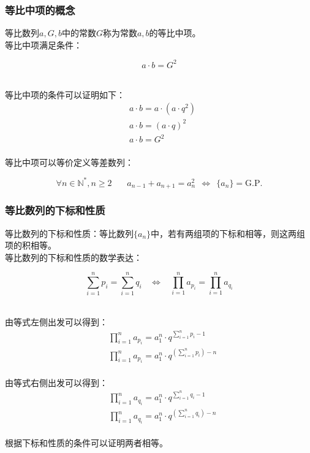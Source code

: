 \documentclass[UTF8]{ctexart}
\begin{document}
\newpage

\subsubsection{等比中项的概念}
    \setcounter{equation}{0}
    等比数列$a,G,b$中的常数$G$称为常数$a,b$的等比中项。\\[3mm]
    等比中项满足条件：
    \begin{large}
        \begin{equation*}
            a\cdot b=G^2
        \end{equation*}
    \end{large}\\
    等比中项的条件可以证明如下：
    \begin{align}
        &a\cdot b=a\cdot (a\cdot q^2)\\[3mm]
        &a\cdot b=(a\cdot q)^2\\[3mm]
        &a\cdot b=G^2
    \end{align}\\
    等比中项可以等价定义等差数列：
    \begin{large}
        \begin{equation*}
            \forall n\in\mathbb{N^*},n\geq 2~~~~~~~~a_{n-1}+a_{n+1}=a_n^2~~\Longleftrightarrow~~\{a_n\}=\text{G.P.}
        \end{equation*}
    \end{large}

\subsubsection{等比数列的下标和性质}
    \setcounter{equation}{0}
    等比数列的下标和性质：等比数列$\{a_n\}$中，若有两组项的下标和相等，则这两组项的积相等。\\[3mm]
    等比数列的下标和性质的数学表达：
    \begin{large}
        \begin{equation*}
            \sum_{i=1}^n p_i=\sum_{i=1}^n q_i~~~~\Longleftrightarrow~~~~\prod_{i=1}^n a_{p_i}=\prod_{i=1}^n a_{q_i}
        \end{equation*}
    \end{large}\\
    由等式左侧出发可以得到：
    \begin{align}
        &\prod_{i=1}^n a_{p_i}=a_1^n\cdot q^{\sum_{i=1}^n p_i-1}\\[3mm]
        &\prod_{i=1}^n a_{p_i}=a_1^n\cdot q^{\left(\sum_{i=1}^n p_i\right)-n}
    \end{align}\\
    由等式右侧出发可以得到：
    \begin{align}
        &\prod_{i=1}^n a_{q_i}=a_1^n\cdot q^{\sum_{i=1}^n q_i-1}\\[3mm]
        &\prod_{i=1}^n a_{q_i}=a_1^n\cdot q^{\left(\sum_{i=1}^n q_i\right)-n}
    \end{align}\\
    根据下标和性质的条件可以证明两者相等。
\end{document}

